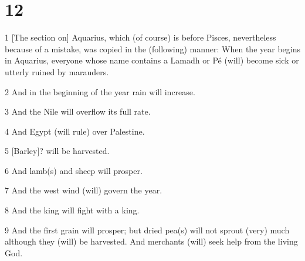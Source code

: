 \chapter{12}

\par 1 [The section on] Aquarius, which (of course) is before Pisces, nevertheless because of a mistake, was copied in the (following) manner: When the year begins in Aquarius, everyone whose name contains a Lamadh or Pé (will) become sick or utterly ruined by marauders.

\par 2 And in the beginning of the year rain will increase. 

\par 3 And the Nile will overflow its full rate. 

\par 4 And Egypt (will rule) over Palestine. 

\par 5 [Barley]? will be harvested. 

\par 6 And lamb(s) and sheep will prosper. 

\par 7 And the west wind (will) govern the year. 

\par 8 And the king will fight with a king.

\par 9 And the first grain will prosper; but dried pea(s) will not sprout (very) much although they (will) be harvested. And merchants (will) seek help from the living God. 



